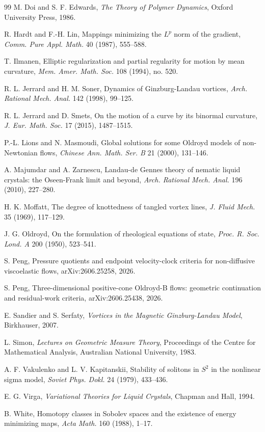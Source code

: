 \documentclass[11pt]{article}
\theoremstyle{definition}
\begin{document}
\begin{thebibliography}{99}
M. Doi and S. F. Edwards,
\emph{The Theory of Polymer Dynamics},
Oxford University Press, 1986.

R. Hardt and F.-H. Lin,
Mappings minimizing the \(L^p\) norm of the gradient,
\emph{Comm. Pure Appl. Math.} 40 (1987), 555--588.

T. Ilmanen,
Elliptic regularization and partial regularity for motion by mean curvature,
\emph{Mem. Amer. Math. Soc.} 108 (1994), no. 520.

R. L. Jerrard and H. M. Soner,
Dynamics of Ginzburg-Landau vortices,
\emph{Arch. Rational Mech. Anal.} 142 (1998), 99--125.

R. L. Jerrard and D. Smets,
On the motion of a curve by its binormal curvature,
\emph{J. Eur. Math. Soc.} 17 (2015), 1487--1515.

P.-L. Lions and N. Masmoudi,
Global solutions for some Oldroyd models of non-Newtonian flows,
\emph{Chinese Ann. Math. Ser. B} 21 (2000), 131--146.

A. Majumdar and A. Zarnescu,
Landau-de Gennes theory of nematic liquid crystals: the Oseen-Frank limit and
beyond,
\emph{Arch. Rational Mech. Anal.} 196 (2010), 227--280.

H. K. Moffatt,
The degree of knottedness of tangled vortex lines,
\emph{J. Fluid Mech.} 35 (1969), 117--129.

J. G. Oldroyd,
On the formulation of rheological equations of state,
\emph{Proc. R. Soc. Lond. A} 200 (1950), 523--541.


S. Peng,
Pressure quotients and endpoint velocity-clock criteria for non-diffusive
viscoelastic flows,
arXiv:2606.25258, 2026.

S. Peng,
Three-dimensional positive-cone Oldroyd-B flows: geometric continuation and
residual-work criteria,
arXiv:2606.25438, 2026.

E. Sandier and S. Serfaty,
\emph{Vortices in the Magnetic Ginzburg-Landau Model},
Birkhauser, 2007.

L. Simon,
\emph{Lectures on Geometric Measure Theory},
Proceedings of the Centre for Mathematical Analysis, Australian National
University, 1983.

A. F. Vakulenko and L. V. Kapitanskii,
Stability of solitons in \(S^2\) in the nonlinear sigma model,
\emph{Soviet Phys. Dokl.} 24 (1979), 433--436.

E. G. Virga,
\emph{Variational Theories for Liquid Crystals},
Chapman and Hall, 1994.

B. White,
Homotopy classes in Sobolev spaces and the existence of energy minimizing maps,
\emph{Acta Math.} 160 (1988), 1--17.

\end{thebibliography}
\end{document}
